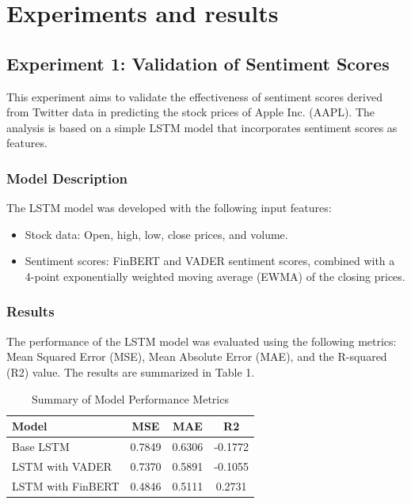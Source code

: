 \documentclass[11pt,a4paper]{article}
\begin{document}
\section{Experiments and results}

    \subsection{Experiment 1: Validation of Sentiment Scores}

    This experiment aims to validate the effectiveness of sentiment scores derived from Twitter data in predicting the stock prices of Apple Inc. (AAPL). The analysis is based on a simple LSTM model that incorporates sentiment scores as features.
    
    \subsubsection{Model Description}
    The LSTM model was developed with the following input features:
    \begin{itemize}
        \item Stock data: Open, high, low, close prices, and volume.
        \item Sentiment scores: FinBERT and VADER sentiment scores, combined with a 4-point exponentially weighted moving average (EWMA) of the closing prices.
    \end{itemize}
    
    \subsubsection{Results}
    The performance of the LSTM model was evaluated using the following metrics: Mean Squared Error (MSE), Mean Absolute Error (MAE), and the R-squared (R2) value. The results are summarized in Table 1.
    
    \begin{table}[ht] %
      \centering
      \caption{Summary of Model Performance Metrics}
      \label{tab:experiment1_results}
      \begin{tabular}{lccc}
      \toprule
      Model & MSE & MAE & R2 \\
      \midrule
      Base LSTM & 0.7849 & 0.6306 & -0.1772 \\
      LSTM with VADER & 0.7370 & 0.5891 & -0.1055 \\
      LSTM with FinBERT & 0.4846 & 0.5111 & 0.2731 \\
      \bottomrule
      \end{tabular}
      \end{table}
      
\end{document}
